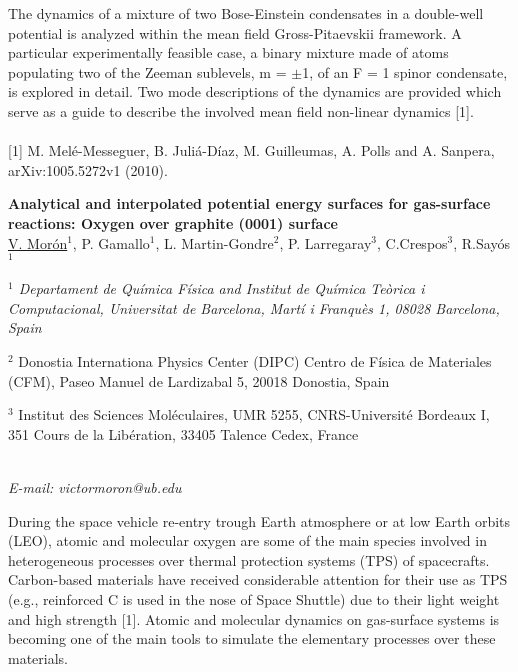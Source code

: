 The dynamics of a mixture of two Bose-Einstein condensates in a double-well potential is analyzed
within the mean field Gross-Pitaevskii framework. A particular experimentally feasible case, a
binary mixture made of atoms populating two of the Zeeman sublevels, m = $\pm$1, of an F = 1
spinor condensate, is explored in detail. Two mode descriptions of the dynamics are provided
which serve as a guide to describe the involved mean field non-linear dynamics [1].
\\
\vspace{0.5cm}
\\
{\footnotesize
[1] M. Melé-Messeguer, B. Juliá-Díaz, M. Guilleumas, A. Polls and A. Sanpera, arXiv:1005.5272v1 (2010).
}
\newpage
\setcounter{figure}{0}
\begin{center}
{\bf \Large
Analytical and interpolated potential energy surfaces for
gas-surface reactions: Oxygen over graphite (0001) surface
}
\\
\vspace{0.5cm}
\underline{V. Morón}$^{1}$, P. Gamallo$^{1}$, L. Martin-Gondre$^{2}$, P. Larregaray$^{3}$, C.Crespos$^{3}$,
R.Sayós$^{1}$
\\
\vspace{0.5cm}
{\it
$^{1}$ Departament de Química Física and Institut de Química Teòrica i Computacional, Universitat de
Barcelona, Martí i Franquès 1, 08028 Barcelona, Spain

$^{2}$ Donostia Internationa Physics Center (DIPC) Centro de Física de Materiales (CFM), Paseo
Manuel de Lardizabal 5, 20018 Donostia, Spain

$^{3}$ Institut des Sciences Moléculaires, UMR 5255, CNRS-Université Bordeaux I, 351 Cours de la
Libération, 33405 Talence Cedex, France
}
\\
\vspace{0.5cm}
{\it E-mail: victormoron@ub.edu}
\\
\vspace{0.5cm}
\end{center}
During the space vehicle re-entry trough Earth atmosphere or at low Earth orbits
(LEO), atomic and molecular oxygen are some of the main species involved in
heterogeneous processes over thermal protection systems (TPS) of spacecrafts.
Carbon-based materials have received considerable attention for their use as TPS
(e.g., reinforced C is used in the nose of Space Shuttle) due to their light weight and
high strength [1]. Atomic and molecular dynamics on gas-surface systems is
becoming one of the main tools to simulate the elementary processes over these
materials.


